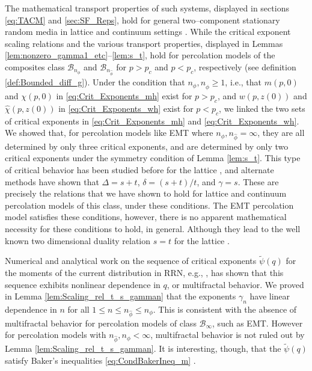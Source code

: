 \documentclass[english,12pt,jmp,graphicx]{revtex4-1}
\newcommand{\ph}{\hat{\phi}}
\begin{document}
The mathematical transport properties of such systems, displayed in
sections \ref{eq:TACM} and \ref{sec:SF_Reps}, hold for general
two--component stationary random media in lattice and continuum settings
\cite{Golden:CMP-473}. While the critical exponent scaling relations
and the various transport properties, displayed in Lemmas
\ref{lem:nonzero_gamma1_etc}--\ref{lem:s_t}, hold for percolation
models of the composites class $\mathcal{B}_{n_\phi}$ and
$\mathcal{B}_{n_{\ph}}$ for $p>p_c$ and $p<p_c$, respectively (see
definition \ref{def:Bounded_diff_g}). Under the   
condition that $n_\phi,n_{\ph}\geq1$, i.e., that $m(p,0)$ and $\chi(p,0)$ in
\eqref{eq:Crit_Exponents_mh} exist for $p>p_c$, and $w(p,z(0))$ and
$\hat{\chi}(p,z(0))$ in \eqref{eq:Crit_Exponents_wh} exist for $p<p_c$,
we linked the two sets of critical exponents in
\eqref{eq:Crit_Exponents_mh} and 
\eqref{eq:Crit_Exponents_wh}. We showed that, for percolation models like
EMT where $n_\phi,n_{\ph}=\infty$, they are all determined by only three critical
exponents, and are determined by only two critical exponents under the 
symmetry condition of Lemma \ref{lem:s_t}. This type of critical
behavior has been studied before for the lattice
\cite{Efros:PSSB-303,Clerc:AP-191,Bergman:SSP-147}, and alternate
methods have shown that $\Delta=s+t$, $\delta=(s+t)/t$, and $\gamma=s$. These are
precisely the relations that we have shown to hold for lattice and
continuum percolation models of this class, under these
conditions. The EMT percolation model satisfies these
conditions, however, there is no apparent mathematical necessity for
these conditions to hold, in general. Although they lead to the well
known two dimensional duality relation $s=t$ for the lattice
\cite{Bergman:SSP-147,Clerc:AP-191,Efros:PSSB-303}. 


Numerical and analytical work on the
sequence of critical exponents $\tilde{\psi}(q)$ for the moments of
the current distribution in RRN, e.g.,
\cite{Stauffer-92,Blumenfeld:PRB-3524,Deuring:JSP-113}, has shown that
this sequence exhibits nonlinear dependence in $q$, or multifractal
behavior. We proved in Lemma \ref{lem:Scaling_rel_t_s_gamman} that the
exponents $\gamma_n$ have linear dependence in $n$ for all
$1\leq n\leq n_{\ph}\leq n_\phi$. This is consistent with the absence of
multifractal behavior for percolation models
of class $\mathcal{B}_{\infty}$, such as EMT. However for percolation
models with $n_{\ph},n_\phi<\infty$, multifractal behavior is not ruled out by Lemma
\ref{lem:Scaling_rel_t_s_gamman}. It is interesting, though, that the
$\tilde{\psi}(q)$ satisfy Baker's inequalities
\eqref{eq:CondBakerIneq_m} \cite{Blumenfeld:PRB-3524}.
\end{document}
